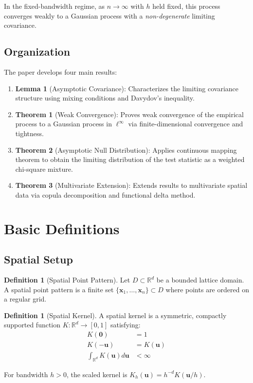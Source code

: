 \documentclass[12pt]{article}
\theoremstyle{plain}
\theoremstyle{definition}
\newtheorem{definition}[theorem]{Definition}
\newcommand{\1}[1]{\mathbf{1}_{#1}}
\begin{document}
In the fixed-bandwidth regime, as $n \to \infty$ with $h$ held fixed, this process converges weakly to a Gaussian process with a \emph{non-degenerate} limiting covariance.

\subsection{Organization}

The paper develops four main results:

\begin{enumerate}
\item \textbf{Lemma 1} (Asymptotic Covariance): Characterizes the limiting covariance structure using mixing conditions and Davydov's inequality.

\item \textbf{Theorem 1} (Weak Convergence): Proves weak convergence of the empirical process to a Gaussian process in $\ell^\infty$ via finite-dimensional convergence and tightness.

\item \textbf{Theorem 2} (Asymptotic Null Distribution): Applies continuous mapping theorem to obtain the limiting distribution of the test statistic as a weighted chi-square mixture.

\item \textbf{Theorem 3} (Multivariate Extension): Extends results to multivariate spatial data via copula decomposition and functional delta method.
\end{enumerate}

\section{Basic Definitions}

\subsection{Spatial Setup}

\begin{definition}[Spatial Point Pattern]
Let $D \subset \mathbb{R}^d$ be a bounded lattice domain. A spatial point pattern is a finite set $\{\mathbf{x}_1, \ldots, \mathbf{x}_n\} \subset D$ where points are ordered on a regular grid.
\end{definition}

\begin{definition}[Spatial Kernel]
A spatial kernel is a symmetric, compactly supported function $K: \mathbb{R}^d \to [0,1]$ satisfying:
\begin{align}
K(\mathbf{0}) &= 1 \\
K(-\mathbf{u}) &= K(\mathbf{u}) \\
\int_{\mathbb{R}^d} K(\mathbf{u}) d\mathbf{u} &< \infty
\end{align}

For bandwidth $h > 0$, the scaled kernel is $K_h(\mathbf{u}) = h^{-d} K(\mathbf{u}/h)$.
\end{definition}
\end{document}
